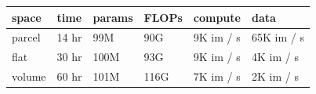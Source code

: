 \begin{tabular}{llllll}
\toprule
space & time & params & FLOPs & compute & data \\
\midrule
parcel & 14 hr & 99M & 90G & 9K im / s & 65K im / s \\
flat & 30 hr & 100M & 93G & 9K im / s & 4K im / s \\
volume & 60 hr & 101M & 116G & 7K im / s & 2K im / s \\
\bottomrule
\end{tabular}

